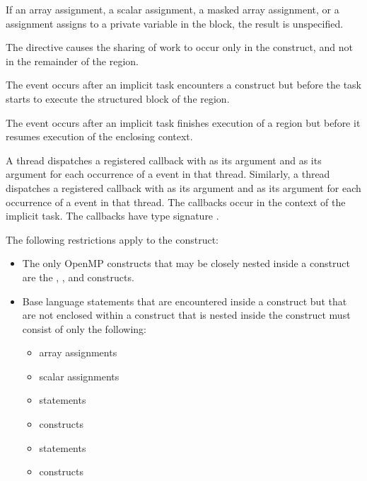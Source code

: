 \begin{fortranspecific}
If an array assignment, a scalar assignment, a masked array assignment, or a 
 assignment assigns to a private variable in the block, the result 
is unspecified.

The  directive causes the sharing of work to occur only in the 
 construct, and not in the remainder of the  region.

\events

The  event occurs after an implicit task encounters a
 construct but before the task starts to execute the structured
block of the  region.

The  event occurs after an implicit task finishes execution of 
a  region but before it resumes execution of the enclosing context.

\tools

A thread dispatches a registered  callback with 
 as its  argument and  
as its  argument for each occurrence of a  event 
in that thread. Similarly, a thread dispatches a registered 
callback with  as its  argument and 
 as its  argument for each occurrence 
of a  event in that thread. The callbacks occur in the context 
of the implicit task. The callbacks have type signature .

\restrictions
The following restrictions apply to the  construct:

\begin{itemize}
\item The only OpenMP constructs that may be closely nested inside a 
      construct are the , , and  constructs.
\item Base language statements that are encountered inside a  construct
      but that are not enclosed within a  construct that is nested
      inside the  construct must consist of only the following: 

\begin{itemize}
\item array assignments
\item scalar assignments
\item {} statements
\item {} constructs
\item {} statements
\item {} constructs
\end{itemize}


\end{itemize}
\end{fortranspecific}
